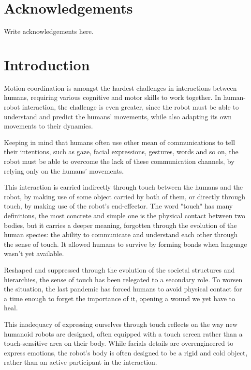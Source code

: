 \documentclass[12pt]{report}
\begin{document}
\chapter*{Acknowledgements}
Write acknowledgements here.
\tableofcontents
\listoffigures
\listoftables

\clearpage


\chapter*{Introduction}
Motion coordination is amongst the hardest challenges in interactions between humans, requiring various cognitive and motor skills to work together. In human-robot interaction, the challenge is even greater, since the robot must be able to understand and predict the humans' movements, while also adapting its own movements to their dynamics. 

Keeping in mind that humans often use other mean of communications to tell their intentions, such as gaze, facial expressions, gestures, words and so on, the robot must be able to overcome the lack of these communication channels, by relying only on the humans' movements.

This interaction is carried indirectly through touch between the humans and the robot, by making use of some object carried by both of them, or directly through touch, by making use of the robot's end-effector. The word "touch" has many definitions, the most concrete and simple one is the physical contact between two bodies, but it carries a deeper meaning, forgotten through the evolution of the human species: the ability to communicate and understand each other through the sense of touch. It allowed humans to survive by forming bonds when language wasn't yet available. 

Reshaped and suppressed through the evolution of the societal structures and hierarchies, the sense of touch has been relegated to a secondary role. To worsen the situation, the last pandemic has forced humans to avoid physical contact for a time enough to forget the importance of it, opening a wound we yet have to heal. 

This inadequacy of expressing ourselves through touch reflects on the way new humanoid robots are designed, often equipped with a touch screen rather than a touch-sensitive area on their body. While facials details are overengineered to express emotions, the robot's body is often designed to be a rigid and cold object, rather than an active participant in the interaction. 
\end{document}
